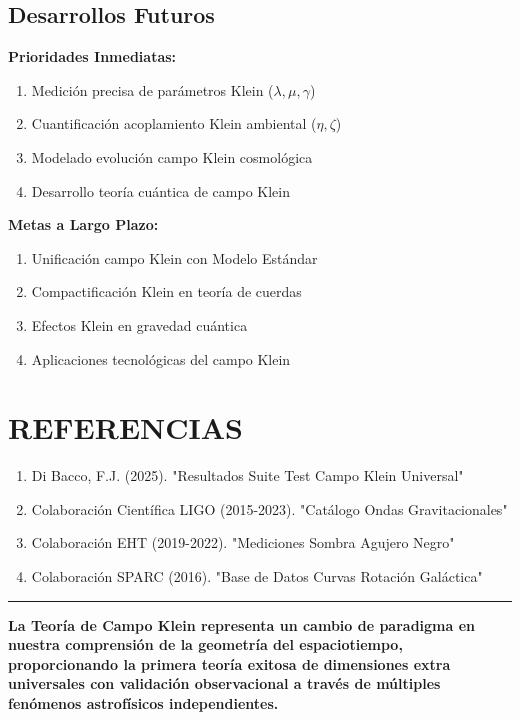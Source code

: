 \documentclass[12pt,a4paper]{article}
\begin{document}
\subsection{Desarrollos Futuros}

\textbf{Prioridades Inmediatas:}
\begin{enumerate}
\item Medición precisa de parámetros Klein ($\lambda, \mu, \gamma$)
\item Cuantificación acoplamiento Klein ambiental ($\eta, \zeta$)
\item Modelado evolución campo Klein cosmológica
\item Desarrollo teoría cuántica de campo Klein
\end{enumerate}

\textbf{Metas a Largo Plazo:}
\begin{enumerate}
\item Unificación campo Klein con Modelo Estándar
\item Compactificación Klein en teoría de cuerdas
\item Efectos Klein en gravedad cuántica
\item Aplicaciones tecnológicas del campo Klein
\end{enumerate}

\section*{REFERENCIAS}

\begin{enumerate}
\item Di Bacco, F.J. (2025). "Resultados Suite Test Campo Klein Universal"
\item Colaboración Científica LIGO (2015-2023). "Catálogo Ondas Gravitacionales"
\item Colaboración EHT (2019-2022). "Mediciones Sombra Agujero Negro"
\item Colaboración SPARC (2016). "Base de Datos Curvas Rotación Galáctica"
\end{enumerate}

\vspace{1cm}
\hrule
\vspace{0.5cm}
\textbf{La Teoría de Campo Klein representa un cambio de paradigma en nuestra comprensión de la geometría del espaciotiempo, proporcionando la primera teoría exitosa de dimensiones extra universales con validación observacional a través de múltiples fenómenos astrofísicos independientes.}
\end{document}
